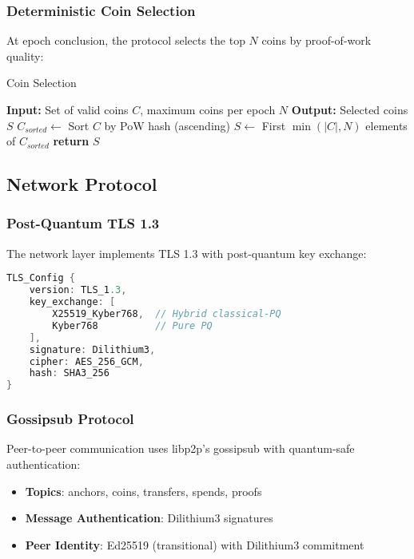 \documentclass[12pt,a4paper]{article}
\begin{document}
\subsubsection{Deterministic Coin Selection}

At epoch conclusion, the protocol selects the top $N$ coins by proof-of-work quality:

\begin{algorithm}
\caption{Coin Selection}
\begin{algorithmic}
\STATE \textbf{Input:} Set of valid coins $C$, maximum coins per epoch $N$
\STATE \textbf{Output:} Selected coins $S$
\STATE $C_{sorted} \leftarrow$ Sort $C$ by PoW hash (ascending)
\STATE $S \leftarrow$ First $\min(|C|, N)$ elements of $C_{sorted}$
\STATE \textbf{return} $S$
\end{algorithmic}
\end{algorithm}

\subsection{Network Protocol}

\subsubsection{Post-Quantum TLS 1.3}

The network layer implements TLS 1.3 with post-quantum key exchange:

\begin{lstlisting}[language=C]
TLS_Config {
    version: TLS_1.3,
    key_exchange: [
        X25519_Kyber768,  // Hybrid classical-PQ
        Kyber768          // Pure PQ
    ],
    signature: Dilithium3,
    cipher: AES_256_GCM,
    hash: SHA3_256
}
\end{lstlisting}

\subsubsection{Gossipsub Protocol}

Peer-to-peer communication uses libp2p's gossipsub with quantum-safe authentication:

\begin{itemize}
\item \textbf{Topics}: anchors, coins, transfers, spends, proofs
\item \textbf{Message Authentication}: Dilithium3 signatures
\item \textbf{Peer Identity}: Ed25519 (transitional) with Dilithium3 commitment
\end{itemize}
\end{document}
